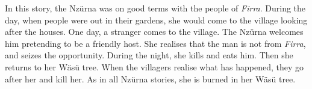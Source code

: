 In this story, the Nzürna was on good terms with the people of \textit{Firra}. During the day, when people were out in their gardens, she would come to the village looking after the houses. One day, a stranger comes to the village. The Nzürna welcomes him pretending to be a friendly host. She realises that the man is not from \textit{Firra}, and seizes the opportunity. During the night, she kills and eats him. Then she returns to her Wäsü tree. When the villagers realise what has happened, they go after her and kill her. As in all Nzürna stories, she is burned in her Wäsü tree.